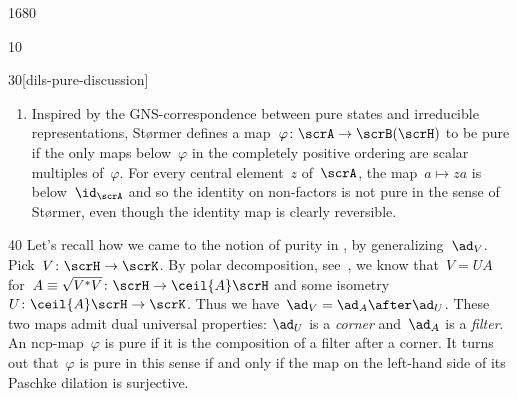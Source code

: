 \begin{parsec}{1680}
\begin{point}{10}
\begin{point}{30}[dils-pure-discussion]
\begin{enumerate}
\item
Inspired by the GNS-correspondence between pure states and
    irreducible representations,
St\o rmer defines a map~$\varphi\colon \scrA \to \scrB(\scrH)$ to be pure
    if the only maps below~$\varphi$ in the completely positive ordering
    are scalar multiples of~$\varphi$.
For every central element~$z$ of~$\scrA$,
    the map~$a \mapsto za$ is below~$\id_\scrA$
    and so the identity on non-factors is not pure in the sense
        of St\o rmer,
        even though the identity map is clearly reversible.
\end{enumerate}
\spacingfix{}
\end{point}
\begin{point}{40}%
Let's recall how we came to the notion of purity in ,
    by generalizing~$\ad_V$.
Pick~$V \colon \scrH \to \scrK$.
    By polar decomposition, see~, we know that~$V = U A$
    for~$A \equiv \sqrt{V^*V} \colon \scrH \to \ceil{A} \scrH$
    and some isometry~$U \colon \ceil{A} \scrH \to \scrK$.
Thus we have~$\ad_V = \ad_A \after \ad_U$.
These two maps admit dual universal properties:
    $\ad_U$ is a \emph{corner}
    and~$\ad_A$ is a \emph{filter}.
An ncp-map~$\varphi$ is pure
    if it is the composition of a filter after a corner.
It turns out that~$\varphi$ is pure in this sense
    if and only if the map on the left-hand side of
    its Paschke dilation is surjective.
\end{point}
\end{point}
\end{parsec}

